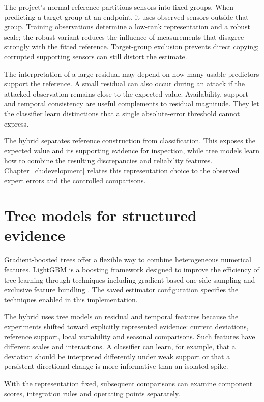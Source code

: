 The project's normal reference partitions sensors into fixed groups. When predicting a target group at an endpoint, it uses observed sensors outside that group. Training observations determine a low-rank representation and a robust scale; the robust variant reduces the influence of measurements that disagree strongly with the fitted reference. Target-group exclusion prevents direct copying; corrupted supporting sensors can still distort the estimate.

The interpretation of a large residual may depend on how many usable predictors support the reference. A small residual can also occur during an attack if the attacked observation remains close to the expected value. Availability, support and temporal consistency are useful complements to residual magnitude. They let the classifier learn distinctions that a single absolute-error threshold cannot express.

The hybrid separates reference construction from classification. This exposes the expected value and its supporting evidence for inspection, while tree models learn how to combine the resulting discrepancies and reliability features. Chapter~\ref{ch:development} relates this representation choice to the observed expert errors and the controlled comparisons.

\section{Tree models for structured evidence}
Gradient-boosted trees offer a flexible way to combine heterogeneous numerical features. LightGBM is a boosting framework designed to improve the efficiency of tree learning through techniques including gradient-based one-side sampling and exclusive feature bundling \cite{lightgbm}. The saved estimator configuration specifies the techniques enabled in this implementation.

The hybrid uses tree models on residual and temporal features because the experiments shifted toward explicitly represented evidence: current deviations, reference support, local variability and seasonal comparisons. Such features have different scales and interactions. A classifier can learn, for example, that a deviation should be interpreted differently under weak support or that a persistent directional change is more informative than an isolated spike.

With the representation fixed, subsequent comparisons can examine component scores, integration rules and operating points separately.

